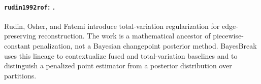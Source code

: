 \paragraph{\texttt{rudin1992rof}: \citet{rudin1992rof}.}
Rudin, Osher, and Fatemi introduce total-variation regularization for edge-preserving reconstruction. The work is a mathematical ancestor of piecewise-constant penalization, not a Bayesian changepoint posterior method. BayesBreak uses this lineage to contextualize fused and total-variation baselines and to distinguish a penalized point estimator from a posterior distribution over partitions.
